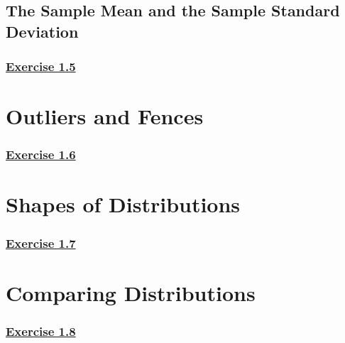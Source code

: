 \documentclass[
  11pt,
]{book}
\begin{document}
\subsection*{The Sample Mean and the Sample Standard Deviation}\label{the-sample-mean-and-the-sample-standard-deviation}

\subsubsection*{\texorpdfstring{\hyperref[ex15a]{Exercise 1.5}}{Exercise 1.5}}\label{exercise-1.5}

\section{Outliers and Fences}\label{outliers-and-fences}

\subsubsection*{\texorpdfstring{\hyperref[ex16a]{Exercise 1.6}}{Exercise 1.6}}\label{exercise-1.6}

\section{Shapes of Distributions}\label{shapes-of-distributions}

\subsubsection*{\texorpdfstring{\hyperref[ex17a]{Exercise 1.7}}{Exercise 1.7}}\label{exercise-1.7}

\section{Comparing Distributions}\label{comparing-distributions}

\subsubsection*{\texorpdfstring{\hyperref[ex18a]{Exercise 1.8}}{Exercise 1.8}}\label{exercise-1.8}
\end{document}
